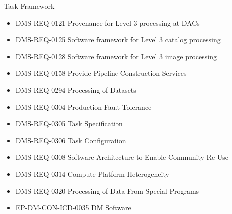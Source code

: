 Task Framework \begin{itemize}
\item DMS-REQ-0121 Provenance for Level 3 processing at DACs
\item DMS-REQ-0125 Software framework for Level 3 catalog processing
\item DMS-REQ-0128 Software framework for Level 3 image processing
\item DMS-REQ-0158 Provide Pipeline Construction Services
\item DMS-REQ-0294 Processing of Datasets
\item DMS-REQ-0304 Production Fault Tolerance
\item DMS-REQ-0305 Task Specification
\item DMS-REQ-0306 Task Configuration
\item DMS-REQ-0308 Software Architecture to Enable Community Re-Use
\item DMS-REQ-0314 Compute Platform Heterogeneity
\item DMS-REQ-0320 Processing of Data From Special Programs
\item EP-DM-CON-ICD-0035 DM Software
\end{itemize}
